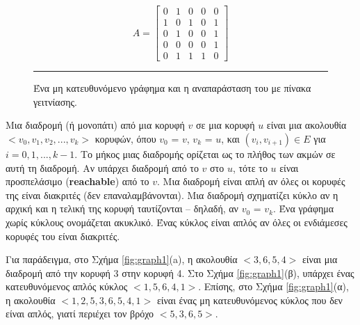 \documentclass[12pt,a4paper]{article} %
\begin{document}
\begin{figure}[ht]
\centering

\begin{minipage}{0.45\textwidth}
\centering
{}
\end{minipage}
\hfill
\begin{minipage}{0.45\textwidth}
\centering
\[
A =
\begin{bmatrix}
0 & 1 & 0 & 0 & 0 \\
1 & 0 & 1 & 0 & 1 \\
0 & 1 & 0 & 0 & 1 \\
0 & 0 & 0 & 0 & 1 \\
0 & 1 & 1 & 1 & 0 
\end{bmatrix}
\]

\end{minipage}

\vspace{0.3cm}
\noindent\rule{\textwidth}{0.2pt}
\caption{Ένα μη κατευθυνόμενο γράφημα και η αναπαράσταση του με πίνακα γειτνίασης.}
\label{fig:graph2}
\end{figure}
\vspace{0.5cm}


Μια διαδρομή (ή μονοπάτι) από μια κορυφή $v$ σε μια κορυφή $u$ είναι μια ακολουθία $<v_0, v_1, v_2, ..., v_k>$ κορυφών, όπου $v_0$ = $v$, $v_k$ = $u$, και $(v_i, v_{i+1}) \in E$ για $i = 0, 1, ..., k-1$. Το μήκος μιας διαδρομής ορίζεται ως το πλήθος των ακμών σε αυτή τη διαδρομή. Αν υπάρχει διαδρομή από το $v$ στο $u$, τότε το $u$ είναι προσπελάσιμο (\textbf{reachable}) από το $v$. Μια διαδρομή είναι απλή αν όλες οι κορυφές της είναι διακριτές (δεν επαναλαμβάνονται). Μια διαδρομή σχηματίζει κύκλο αν η αρχική και η τελική της κορυφή ταυτίζονται – δηλαδή, αν $v_0$ = $v_k$. Ένα γράφημα χωρίς κύκλους ονομάζεται ακυκλικό. Ένας κύκλος είναι απλός αν όλες οι ενδιάμεσες κορυφές του είναι διακριτές.


Για παράδειγμα, στο Σχήμα \ref{fig:graph1}(a), η ακολουθία $<3, 6, 5, 4>$ είναι μια διαδρομή από την κορυφή 3 στην κορυφή 4. Στο Σχήμα \ref{fig:graph1}(β), υπάρχει ένας κατευθυνόμενος απλός κύκλος $<1, 5, 6, 4, 1>$. Επίσης, στο Σχήμα \ref{fig:graph1}(α), η ακολουθία $<1, 2, 5, 3, 6, 5, 4, 1>$ είναι ένας μη κατευθυνόμενος κύκλος που δεν είναι απλός, γιατί περιέχει τον βρόχο $<5, 3, 6, 5>$.
\end{document}
